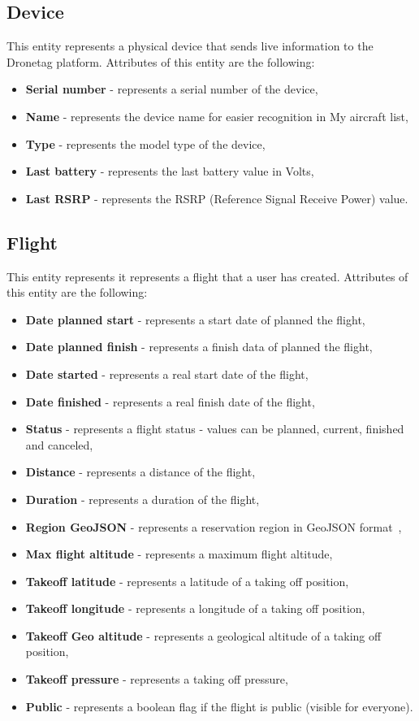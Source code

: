 \subsection{Device}\label{subsec:device}
This entity represents a physical device that sends live information to the Dronetag platform.
Attributes of this entity are the following:
\begin{itemize}
    \item \textbf{Serial number} - represents a serial number of the device,
    \item \textbf{Name} - represents the device name for easier recognition in My aircraft list,
    \item \textbf{Type} - represents the model type of the device,
    \item \textbf{Last battery} - represents the last battery value in Volts,
    \item \textbf{Last RSRP} - represents the RSRP (Reference Signal Receive Power) value.
\end{itemize}

\subsection{Flight}\label{subsec:flight}
This entity represents it represents a flight that a user has created.
Attributes of this entity are the following:
\begin{itemize}
    \item \textbf{Date planned start} - represents a start date of planned the flight,
    \item \textbf{Date planned finish} - represents a finish data of planned the flight,
    \item \textbf{Date started} - represents a real start date of the flight,
    \item \textbf{Date finished} - represents a real finish date of the flight,
    \item \textbf{Status} - represents a flight status - values can be planned, current, finished and canceled,
    \item \textbf{Distance} - represents a distance of the flight,
    \item \textbf{Duration} - represents a duration of the flight,
    \item \textbf{Region GeoJSON} - represents a reservation region in GeoJSON format~\cite{geoJson},
    \item \textbf{Max flight altitude} - represents a maximum flight altitude,
    \item \textbf{Takeoff latitude} - represents a latitude of a taking off position,
    \item \textbf{Takeoff longitude} - represents a longitude of a taking off position,
    \item \textbf{Takeoff Geo altitude} - represents a geological altitude of a taking off position,
    \item \textbf{Takeoff pressure} - represents a taking off pressure,
    \item \textbf{Public} - represents a boolean flag if the flight is public (visible for everyone).
\end{itemize}

